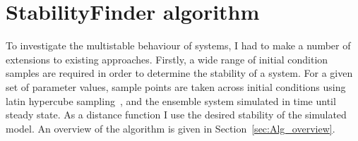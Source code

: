 % 
%
%
\section{StabilityFinder algorithm}

To investigate the multistable behaviour of systems, I had to make a number of extensions to existing approaches. Firstly, a wide range of initial condition samples are required in order to determine the stability of a system. For a given set of parameter values, sample points are taken across initial conditions using latin hypercube sampling~\autocite{MCKAY:2000vt}, and the ensemble system simulated in time until steady state. As a distance function I use the desired stability of the simulated model. An overview of the algorithm is given in Section~\ref{sec:Alg_overview}. %



